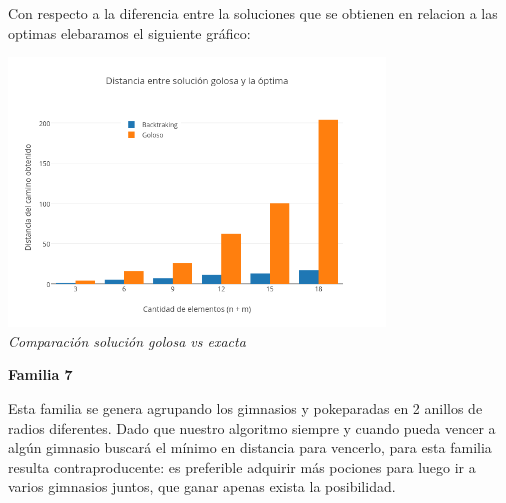Con respecto a la diferencia entre la soluciones que se obtienen en relacion a las optimas elebaramos el siguiente gráfico:\\

\vspace*{0.3cm} \vspace*{0.3cm}
  \begin{center}
 \includegraphics[width=0.75\textwidth]{./EJ2/sinOrdenDif.png}
\\{\textit{Comparación solución golosa vs exacta}}
  \end{center}
  
\begin{center}
\textbf{Familia 7}
\end{center}

Esta familia se genera agrupando los gimnasios y pokeparadas en 2 anillos de radios diferentes. Dado que nuestro algoritmo siempre y cuando pueda vencer a alg\'un gimnasio buscará el m\'inimo en  distancia para vencerlo, para esta familia resulta contraproducente: es preferible adquirir m\'as pociones para luego ir a varios gimnasios juntos, que ganar apenas exista la posibilidad.

\newpage

